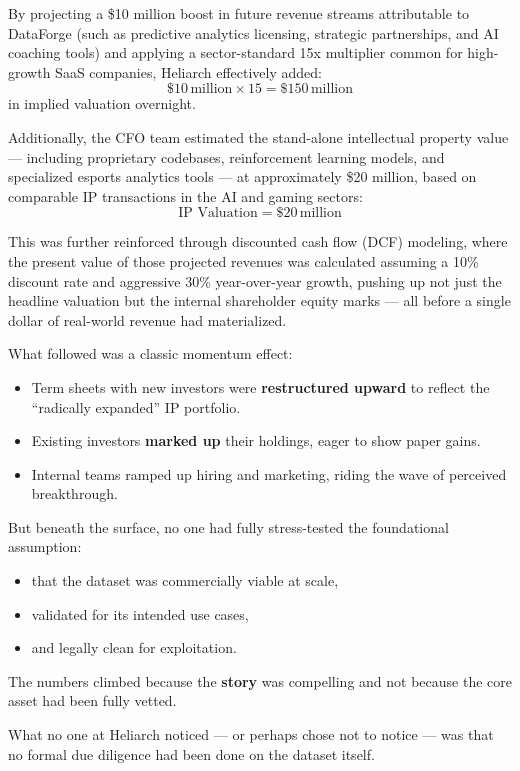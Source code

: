 By projecting a \$10 million boost in future revenue streams attributable to DataForge (such as predictive analytics licensing, strategic partnerships, and AI coaching tools) and applying a sector-standard 15x multiplier common for high-growth SaaS companies, Heliarch effectively added:
\[
\$10\,\text{million} \times 15 = \$150\,\text{million}
\]
in implied valuation overnight.

Additionally, the CFO team estimated the stand-alone intellectual property value — including proprietary codebases, reinforcement learning models, and specialized esports analytics tools — at approximately \$20 million, based on comparable IP transactions in the AI and gaming sectors:
\[
\text{IP Valuation} = \$20\,\text{million}
\]

This was further reinforced through discounted cash flow (DCF) modeling, where the present value of those projected revenues was calculated assuming a 10\% discount rate and aggressive 30\% year-over-year growth, pushing up not just the headline valuation but the internal shareholder equity marks — all before a single dollar of real-world revenue had materialized.


What followed was a classic momentum effect:

\begin{itemize}
    \item Term sheets with new investors were \textbf{restructured upward} to reflect the “radically expanded” IP portfolio.
    \item Existing investors \textbf{marked up} their holdings, eager to show paper gains.
    \item Internal teams ramped up hiring and marketing, riding the wave of perceived breakthrough.
\end{itemize}

But beneath the surface, no one had fully stress-tested the foundational assumption: 

\begin{itemize}
    \item that the dataset was commercially viable at scale, 
    \item validated for its intended use cases, 
    \item and legally clean for exploitation.
\end{itemize}

The numbers climbed because the \textbf{story} was compelling and not because the core asset had been fully vetted.

What no one at Heliarch noticed --- or perhaps chose not to notice --- was that no formal due diligence had been done on the dataset itself.

